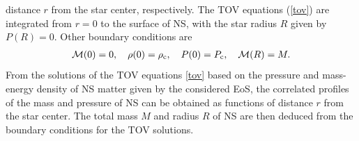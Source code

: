 distance $r$ from the star center, respectively. The \gls{TOV} equations (\ref{tov}) are 
integrated from $r=0$ to the surface of NS, with the star radius $R$ given by 
$P(R)=0$. Other boundary conditions are 
\begin{align}
\mathcal{M}(0)=0, \quad \rho(0)=\rho_{\rm c}, \quad P(0)=P_{\rm c},\quad \mathcal{M}(R)=M.   
\label{Bdr}
\end{align}
From the solutions of the \gls{TOV} equations \eqref{tov} based on the pressure and mass-energy
density of \gls{NS} matter given by the considered \gls{EoS}, the correlated profiles of the mass 
and pressure of \gls{NS} can be obtained as functions of distance $r$ from the star center. 
The total mass $M$ and radius $R$ of \gls{NS} are then deduced from the boundary conditions 
for the \gls{TOV} solutions.

